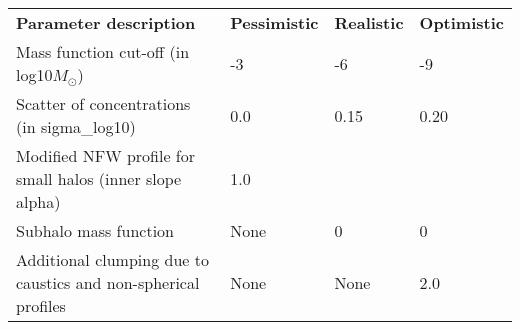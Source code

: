 \begin{table}
    \begin{tabular}{llll}
    \textbf{Parameter description}                                    & \textbf{Pessimistic} & \textbf{Realistic} & \textbf{Optimistic} \hline \hline \\
    Mass function cut-off (in log10$M_\odot$)        & -3 & -6 & -9 \\
    Scatter of concentrations (in sigma\_log10)              & 0.0 & 0.15 & 0.20 \\
    Modified NFW profile for small halos (inner slope alpha) & 1.0 & \cite{Ishiyama_2014} &  \cite{Ishiyama_2014} \\
    Subhalo mass function & None & 0 & 0 \\
    Additional clumping due to caustics and non-spherical profiles & None & None & 2.0
\\    \end{tabular}
\end{table}